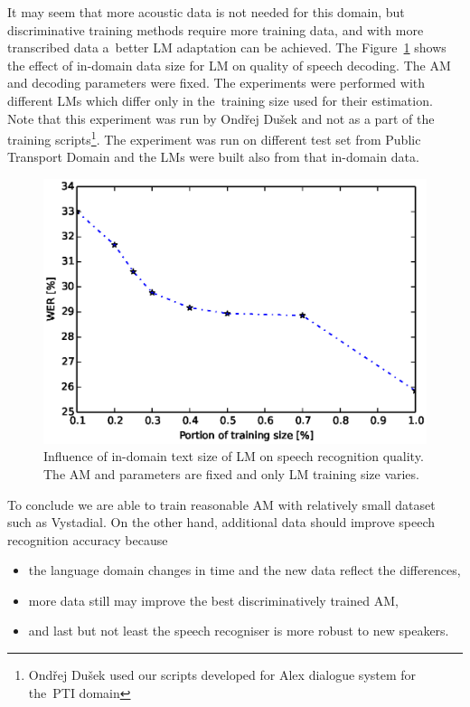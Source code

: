 It may seem that more acoustic data is not needed for this domain, but discriminative training methods require more training data, and with more transcribed data a~better \ac{LM} adaptation can be achieved.
The Figure~\ref{fig:partials_lm} shows the effect of in-domain data size for \ac{LM} on quality of speech decoding.
The \ac{AM}  and decoding parameters were fixed.
The experiments were performed with different \acp{LM} which differ only in the~training size used for their estimation. 
Note that this experiment was run by Ondřej Dušek and not as a part of the training scripts\footnote{Ondřej Dušek used our scripts developed for Alex dialogue system for the~\ac{PTI} domain}.
The experiment was run on different test set from Public Transport Domain and the \acp{LM} were built also from that in-domain data.
\begin{figure}[!htp]
    \begin{center}
    \includegraphics[scale=0.7]{images/partial-lm-tri2b-bmmi.ps}
    \caption{Influence of in-domain text size of \ac{LM} on speech recognition quality. The \ac{AM}  and parameters are fixed and only \ac{LM} training size varies.}
    \label{fig:partials_lm} 
    \end{center}
\end{figure}

To conclude we are able to train reasonable \ac{AM} with relatively small dataset such as Vystadial.
On the other hand, additional data should improve speech recognition accuracy because
\begin{itemize}
    \item the language domain changes in time and the new data reflect the differences,
    \item more data still may improve the best discriminatively trained \ac{AM},
    \item and last but not least the speech recogniser is more robust to new speakers.
\end{itemize}


